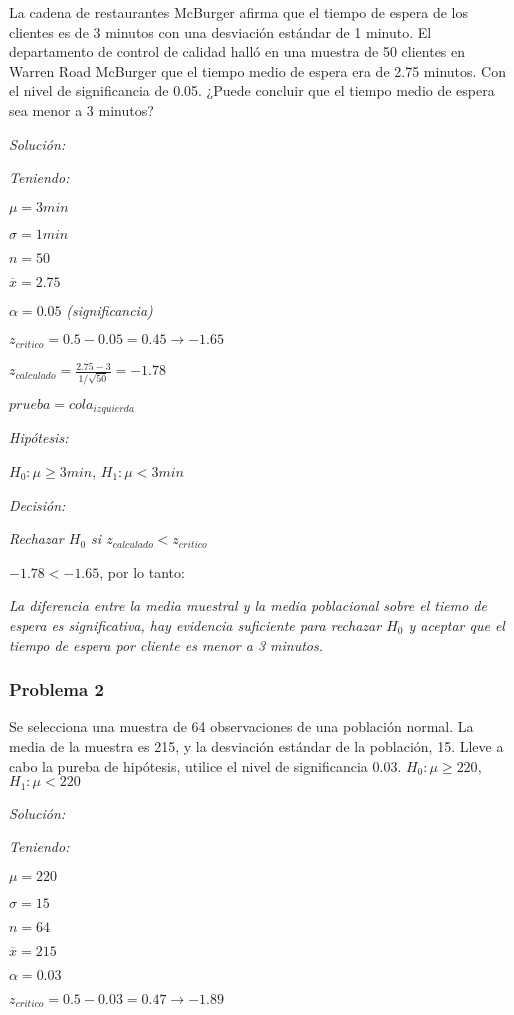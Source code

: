 \documentclass[a4paper, 12pt]{article}
\begin{document}
La cadena de restaurantes McBurger afirma que el tiempo de espera de los clientes es de 3 minutos con una desviación estándar de 1 minuto. El departamento de control de calidad halló en una muestra de 50 clientes en Warren Road McBurger que el tiempo medio de espera era de 2.75 minutos. Con el nivel de significancia de 0.05. ¿Puede concluir que el tiempo medio de espera sea menor a 3 minutos?

\emph{Solución:}

\emph{Teniendo:}

$\mu=3min$

$\sigma=1min$

$n=50$

$\overline{x}=2.75$

$\alpha=0.05$ \emph{(significancia)}

$z_{critico}=0.5-0.05=0.45\to -1.65$

$z_{calculado}=\frac{2.75-3}{1/\sqrt{50}}=-1.78$

$prueba=cola_{izquierda}$

\emph{Hipótesis:}

$H_0:\mu\geq 3min$, $H_1:\mu<3min$

\emph{Decisión:}

\emph{Rechazar $H_0$ si $z_{calculado}<z_{critico}$}

\textbf{$-1.78<-1.65$}, por lo tanto:

\emph{La diferencia entre la media muestral y la media poblacional sobre el tiemo de espera es significativa, hay evidencia suficiente para rechazar $H_0$ y aceptar que el tiempo de espera por cliente es menor a 3 minutos.}

\subsubsection{Problema 2}
Se selecciona una muestra de 64 observaciones de una población normal. La media de la muestra es 215, y la desviación estándar de la población, 15. Lleve a cabo la pureba de hipótesis, utilice el nivel de significancia 0.03. $H_0:\mu\geq 220$, $H_1:\mu<220$

\emph{Solución:}

\emph{Teniendo:}

$\mu=220$

$\sigma=15$

$n=64$

$\overline{x}=215$

$\alpha=0.03$

$z_{critico}=0.5-0.03=0.47\to -1.89$
\end{document}
